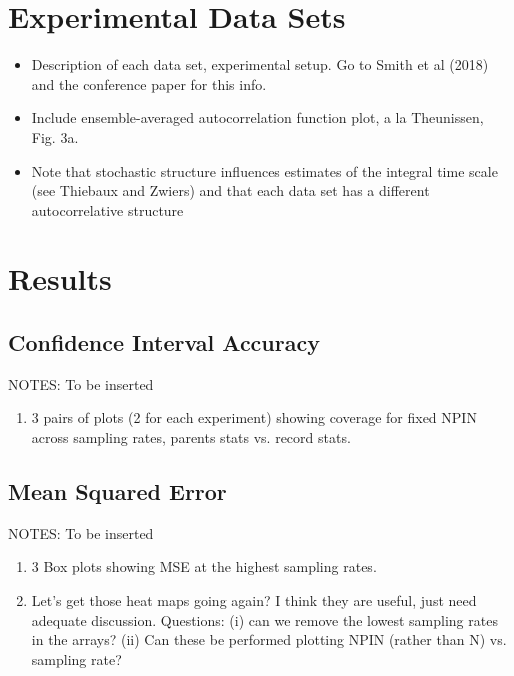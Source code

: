 \documentclass[onecolumn,12pt]{iopart}
\begin{document}
{\section{Experimental Data Sets}
\begin{itemize}
	\item Description of each data set, experimental setup. Go to Smith et al (2018) and the conference paper for this info.
	\item Include ensemble-averaged autocorrelation function plot, a la Theunissen, Fig. 3a. %
	\item Note that stochastic structure influences estimates of the integral time scale (see Thiebaux and Zwiers) and that each data set has a different autocorrelative structure
\end{itemize}

\section{Results}
\subsection{Confidence Interval Accuracy}

NOTES: To be inserted
\begin{enumerate}[1.]
\item 3 pairs of plots (2 for each experiment) showing coverage for fixed NPIN across sampling rates, parents stats vs. record stats.
\end{enumerate}
\subsection{Mean Squared Error}
NOTES: To be inserted
\begin{enumerate}[1.]
\item 3 Box plots showing MSE at the highest sampling rates.
\item Let's get those heat maps going again?  I think they are useful, just need adequate discussion.  Questions: (i) can we remove the lowest sampling rates in the arrays?  (ii) Can these be performed plotting NPIN (rather than N) vs. sampling rate?
\end{enumerate}

\begin{comment}
\begin{figure}[H]
\begin{center}
\caption{Ensemble average error of the mean as a function of the number of samples acquired.  Dashed line is the standard error.}
\label{fig:windtunnel}
\end{center}
\end{figure}


\end{comment}}
\end{document}
